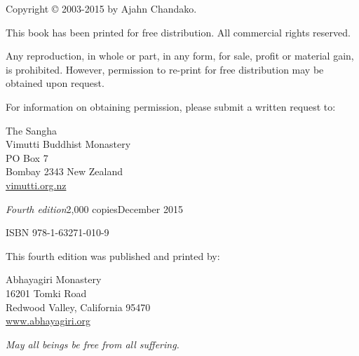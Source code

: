 Copyright © 2003-2015 by Ajahn Chandako.

This book has been printed for free distribution. All commercial rights
reserved.

Any reproduction, in whole or part, in any form, for sale, profit or material
gain, is prohibited. However, permission to re-print for free distribution may
be obtained upon request.

For information on obtaining permission, please submit a written request to:

\begin{copyrightindent}
  The Sangha\\
  Vimutti Buddhist Monastery\\
  PO Box 7\\
  Bombay 2343 New Zealand\\
  \href{http://vimutti.org.nz/}{vimutti.org.nz}
\end{copyrightindent}

\textit{Fourth edition}\hspace*{0.5em}2,000 copies\hspace*{0.5em}December 2015

ISBN 978-1-63271-010-9

This fourth edition was published and printed by:

\begin{copyrightindent}
  Abhayagiri Monastery\\
  16201 Tomki Road\\
  Redwood Valley, California 95470\\
  \href{http://www.abhayagiri.org/}{www.abhayagiri.org}
\end{copyrightindent}

\textit{May all beings be free from all suffering.}
